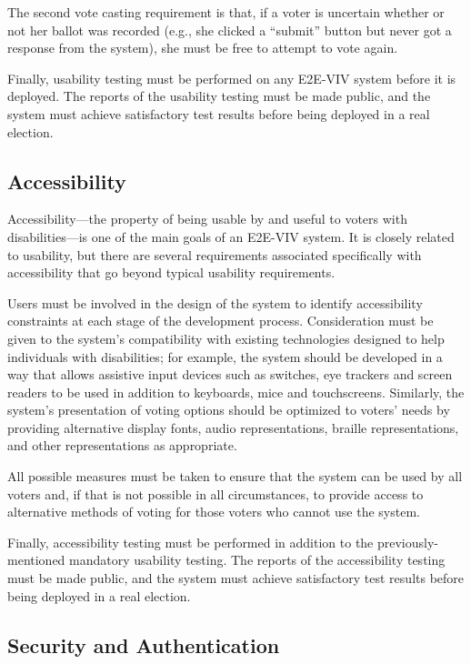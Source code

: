 The second vote casting requirement is that, if a voter is uncertain
whether or not her ballot was recorded (e.g., she clicked a ``submit''
button but never got a response from the system), she must be free
to attempt to vote again.

Finally, usability testing must be performed on any E2E-VIV system
before it is deployed. The reports of the usability testing must be
made public, and the system must achieve satisfactory test results
before being deployed in a real election.

\subsection{Accessibility}

Accessibility---the property of being usable by and useful to voters
with disabilities---is one of the main goals of an E2E-VIV system. It
is closely related to usability, but there are several requirements
associated specifically with accessibility that go beyond typical
usability requirements.

Users must be involved in the design of the system to identify
accessibility constraints at each stage of the development
process. Consideration must be given to the system's compatibility
with existing technologies designed to help individuals with
disabilities; for example, the system should be developed in a way
that allows assistive input devices such as switches, eye trackers and
screen readers to be used in addition to keyboards, mice and
touchscreens. Similarly, the system's presentation of voting options
should be optimized to voters' needs by providing alternative display
fonts, audio representations, braille representations, and other
representations as appropriate.

All possible measures must be taken to ensure that the system can be
used by all voters and, if that is not possible in all circumstances,
to provide access to alternative methods of voting for those voters
who cannot use the system.

Finally, accessibility testing must be performed in addition to the
previously-mentioned mandatory usability testing. The reports of the
accessibility testing must be made public, and the system must achieve
satisfactory test results before being deployed in a real election.

\subsection{Security and Authentication}

